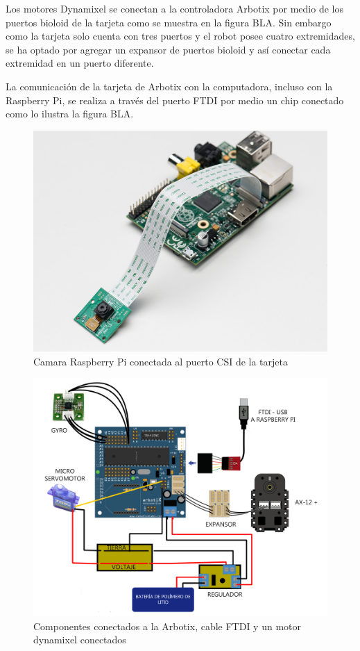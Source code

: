  
Los motores Dynamixel se conectan a la controladora Arbotix por medio de los puertos bioloid de la tarjeta como se muestra en la figura BLA. Sin embargo como la tarjeta solo cuenta con tres puertos y el robot posee cuatro extremidades, se ha optado por agregar un expansor de puertos bioloid y así conectar cada extremidad en un puerto diferente. 

La comunicación de la tarjeta de Arbotix con la computadora, incluso con la Raspberry Pi, se realiza a través del puerto FTDI por medio un chip conectado como lo ilustra la figura BLA.

\begin{figure}[hbtp]
\centering
\includegraphics[scale=1]{imagenes/raspbCam.jpg}
\caption{Camara Raspberry Pi conectada al puerto CSI de la tarjeta}
\end{figure}


\begin{figure}[hbtp]
\centering
\includegraphics[scale=0.2]{imagenes/arbotix_servo.png}
\caption{Componentes conectados a la Arbotix, cable FTDI y un motor dynamixel conectados }
\end{figure}


